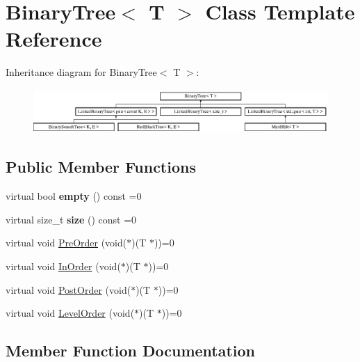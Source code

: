 \hypertarget{classBinaryTree}{}\section{Binary\+Tree$<$ T $>$ Class Template Reference}
\label{classBinaryTree}
Inheritance diagram for Binary\+Tree$<$ T $>$\+:\begin{figure}[H]
\begin{center}
\leavevmode
\includegraphics[height=1.680000cm]{classBinaryTree}
\end{center}
\end{figure}
\subsection*{Public Member Functions}
\begin{DoxyCompactItemize}
\item 
\mbox{\label{classBinaryTree_a6d3447d1a09fa69e4e34e25f0f53b6f1}} 
virtual bool {\bfseries empty} () const =0
\item 
\mbox{\label{classBinaryTree_a6f43c6aee330a62beeb0fedb3be25404}} 
virtual size\+\_\+t {\bfseries size} () const =0
\item 
virtual void \hyperlink{classBinaryTree_a34fabb6ce2424c3ef1e038e148e273c5}{Pre\+Order} (void($\ast$)(T $\ast$))=0
\item 
virtual void \hyperlink{classBinaryTree_a45706a2cafb858f169506470ae440c8a}{In\+Order} (void($\ast$)(T $\ast$))=0
\item 
virtual void \hyperlink{classBinaryTree_a8bc36fb3d3a12ef13d30cc9b4b84e428}{Post\+Order} (void($\ast$)(T $\ast$))=0
\item 
virtual void \hyperlink{classBinaryTree_a1d6ccf7f6b6e1b9a702b12fd5ca6dc32}{Level\+Order} (void($\ast$)(T $\ast$))=0
\end{DoxyCompactItemize}


\subsection{Member Function Documentation}
\mbox{\label{classBinaryTree_a45706a2cafb858f169506470ae440c8a}} 
